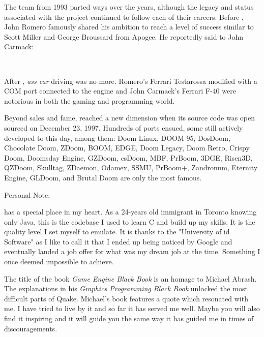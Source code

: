 \thispagestyle{plain} %




The \doom{} team from 1993 parted ways over the years, although the legacy and status associated with the project continued to follow each of their careers. Before \doom{}, John Romero famously shared his ambition to reach a level of success similar to Scott Miller and George Broussard from Apogee. He reportedly said to John Carmack: \\
\par
 \\
 \par
After \doom{}, \textit{ass car} driving was no more. Romero's Ferrari Testarossa modified with a COM port connected to the engine and John Carmack's Ferrari F-40 were notorious in both the gaming and programming world.\\
\par
Beyond sales and fame, \doom{} reached a new dimension when its source code was open sourced on December 23, 1997. Hundreds of ports ensued, some still actively developed to this day, among them: Doom Linux, DOOM 95, DosDoom, Chocolate Doom, ZDoom, BOOM, EDGE, Doom Legacy, Doom Retro, Crispy Doom, Doomsday Engine, GZDoom, csDoom, MBF, PrBoom, 3DGE, Risen3D, QZDoom, Skulltag, ZDaemon, Odamex, SSMU, PrBoom+, Zandronum, Eternity Engine, GLDoom, and Brutal Doom are only the most famous.\\
\par
\vspace{10pt}
\b{Personal Note:}\\
\par
\doom{} has a special place in my heart. As a 24-years old immigrant in Toronto knowing only Java, this is the codebase I used to learn C and build up my skills. It is the quality level I set myself to emulate. It is thanks to the "University of id Software" as I like to call it that I ended up being noticed by Google and eventually landed a job offer for what was my dream job at the time. Something I once deemed impossible to achieve.\\
\par
The title of the book \textit{Game Engine Black Book} is an homage to Michael Abrash. The explanations in his \textit{Graphics Programming Black Book} unlocked the most difficult parts of Quake. Michael's book features a quote which resonated with me. I have tried to live by it and so far it has served me well. Maybe you will also find it inspiring and it will guide you the same way it has guided me in times of discouragements.\\
\par
{}
\thispagestyle{plain} %

